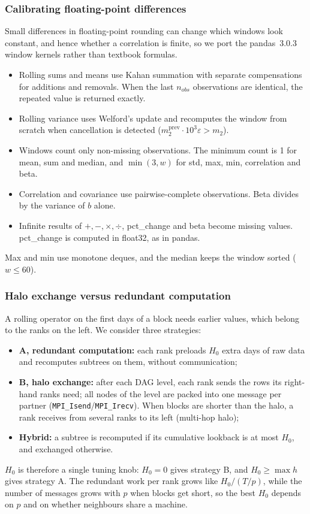 \documentclass[11pt,a4paper]{article}
\newcommand{\code}[1]{\texttt{#1}}
\begin{document}
\subsubsection{Calibrating floating-point differences}
\label{sec:fpcal}
Small differences in floating-point rounding can change which windows look constant, and hence whether a correlation is finite, so we port the pandas~3.0.3 window kernels rather than textbook formulas.
\begin{itemize}[nosep]
  \item Rolling sums and means use Kahan summation with separate compensations for additions and removals. When the last $n_{obs}$ observations are identical, the repeated value is returned exactly.
  \item Rolling variance uses Welford's update and recomputes the window from scratch when cancellation is detected ($m_2^{\text{prev}}\cdot10^3\varepsilon > m_2$).
  \item Windows count only non-missing observations. The minimum count is 1 for mean, sum and median, and $\min(3,w)$ for std, max, min, correlation and beta.
  \item Correlation and covariance use pairwise-complete observations. Beta divides by the variance of $b$ alone.
  \item Infinite results of $+,-,\times,\div$, pct\_change and beta become missing values. pct\_change is computed in float32, as in pandas.
\end{itemize}
Max and min use monotone deques, and the median keeps the window sorted ($w\le60$).

\subsubsection{Halo exchange versus redundant computation}
\label{sec:halo}
A rolling operator on the first days of a block needs earlier values, which belong to the ranks on the left. We consider three strategies:
\begin{itemize}[nosep]
  \item \textbf{A, redundant computation:} each rank preloads $H_0$ extra days of raw data and recomputes subtrees on them, without communication;
  \item \textbf{B, halo exchange:} after each DAG level, each rank sends the rows its right-hand ranks need; all nodes of the level are packed into one message per partner (\code{MPI\_Isend}/\code{MPI\_Irecv}). When blocks are shorter than the halo, a rank receives from several ranks to its left (multi-hop halo);
  \item \textbf{Hybrid:} a subtree is recomputed if its cumulative lookback is at most $H_0$, and exchanged otherwise.
\end{itemize}
$H_0$ is therefore a single tuning knob: $H_0=0$ gives strategy B, and $H_0\ge \max h$ gives strategy A. The redundant work per rank grows like $H_0/(T/p)$, while the number of messages grows with $p$ when blocks get short, so the best $H_0$ depends on $p$ and on whether neighbours share a machine.
\end{document}
